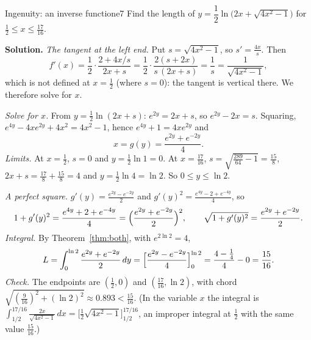 \documentclass[11pt]{article}
\begin{document}
\begin{exmp}{Ingenuity: an inverse function}{e7}
Find the length of $y=\dfrac12\ln\bigl(2x+\sqrt{4x^2-1}\bigr)$ for $\frac12\le x\le\frac{17}{16}$.

\textbf{Solution.} \emph{The tangent at the left end.} Put $s=\sqrt{4x^2-1}$, so $s'=\frac{4x}s$. Then
\[
f'(x)=\frac12\cdot\frac{2+4x/s}{2x+s}=\frac12\cdot\frac{2(s+2x)}{s\,(2x+s)}=\frac1s=\frac1{\sqrt{4x^2-1}} ,
\]
which is not defined at $x=\frac12$ (where $s=0$): the tangent is vertical there. We therefore solve for $x$.

\emph{Solve for $x$.} From $y=\frac12\ln(2x+s)$: $e^{2y}=2x+s$, so $e^{2y}-2x=s$. Squaring, $e^{4y}-4xe^{2y}+4x^2=4x^2-1$, hence $e^{4y}+1=4xe^{2y}$ and
\[
x=g(y)=\frac{e^{2y}+e^{-2y}}4 .
\]
\emph{Limits.} At $x=\frac12$, $s=0$ and $y=\frac12\ln1=0$. At $x=\frac{17}{16}$, $s=\sqrt{\frac{289}{64}-1}=\frac{15}8$, $2x+s=\frac{17}8+\frac{15}8=4$ and $y=\frac12\ln4=\ln2$. So $0\le y\le\ln2$.

\emph{A perfect square.} $g'(y)=\frac{e^{2y}-e^{-2y}}2$ and $g'(y)^2=\frac{e^{4y}-2+e^{-4y}}4$, so
\[
1+g'(y)^2=\frac{e^{4y}+2+e^{-4y}}4=\Bigl(\frac{e^{2y}+e^{-2y}}2\Bigr)^2,\qquad\sqrt{1+g'(y)^2}=\frac{e^{2y}+e^{-2y}}2 .
\]
\emph{Integral.} By Theorem~\ref{thm:both}, with $e^{2\ln2}=4$,
\[
L=\int_0^{\ln2}\frac{e^{2y}+e^{-2y}}2\,dy=\Bigl[\frac{e^{2y}-e^{-2y}}4\Bigr]_0^{\ln2}=\frac{4-\frac14}4-0=\frac{15}{16}.
\]
\emph{Check.} The endpoints are $(\frac12,0)$ and $(\frac{17}{16},\ln2)$, with chord $\sqrt{(\frac9{16})^2+(\ln2)^2}\approx0.893<\frac{15}{16}$. (In the variable $x$ the integral is $\int_{1/2}^{17/16}\frac{2x}{\sqrt{4x^2-1}}\,dx=\bigl[\frac12\sqrt{4x^2-1}\bigr]_{1/2}^{17/16}$, an improper integral at $\frac12$ with the same value $\frac{15}{16}$.)


\end{exmp}
\end{document}
